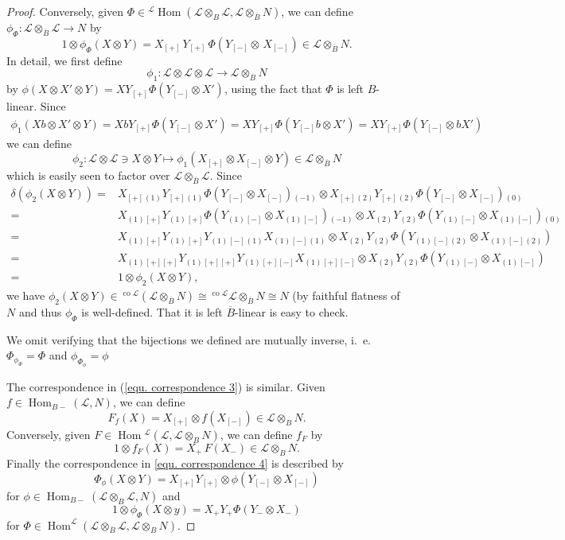 \documentclass[a4paper,reqno]{amsart}
\DeclareMathOperator{\Hom}{Hom}
\numberwithin{equation}{section}
\theoremstyle{plain}
\theoremstyle{remark}
\numberwithin{equation}{section}
\newcommand{\ot}{\otimes}
\newcommand{\cL}{\mathcal{L}}
\newcommand{\BB}{\overline{B}}
\newcommand{\z}{{}_{\scriptscriptstyle{(0)}}}
\renewcommand{\o}{{}_{\scriptscriptstyle{(1)}}}
\newcommand{\mo}{{}_{\scriptscriptstyle{(-1)}}}
\renewcommand{\t}{{}_{\scriptscriptstyle{(2)}}}
\newcommand\ou[1]{\otimes_{#1}}
\newcommand{\CL}{\mathcal{L}}
\newcommand\co{{\operatorname{co}}}
\begin{document}
\begin{proof}
Conversely, given $\Phi\in {}^{\cL}\Hom(\cL\ot_{B}\cL,\cL\ot_{\BB}N)$, we can define $\phi_\Phi\colon \CL\ou\BB\CL\to N$ by
\[1\ot \phi_{\Phi}(X\ot Y)=X_{[+]}\,Y_{[+]}\,\Phi(Y_{[-]}\ot\,X_{[-]})\in\CL\ou\BB N.\]
In detail, we first define 
\[\phi_1\colon \CL\ot \CL\ot\CL\to \CL\ou \BB N\]
by $\phi(X\ot X'\ot Y)=XY_{[+]}\Phi(Y_{[-]}\ot X')$, using the fact that $\Phi$ is left $B$-linear. Since
\begin{multline*}
    \phi_1(Xb\ot X'\ot Y)
    =XbY_{[+]}\Phi(Y_{[-]}\ot X')
    =XY_{[+]}\Phi(Y_{[-]}b\ot X')
    =XY_{[+]}\Phi(Y_{[-]}\ot bX')
\end{multline*}
we can define 
\[\phi_2\colon \CL\ot\CL\ni X\ot Y\mapsto \phi_1(X_{[+]}\ot X_{[-]}\ot Y)\in \CL\ou\BB N \]
which is easily seen to factor over $\CL\ou\BB\CL$. Since
\begin{align*}
   \delta(\phi_2(X\ot Y))
   =&X_{[+]}\o Y_{[+]}\o\Phi(Y_{[-]}\ot X_{[-]})\mo\ot X_{[+]}\t Y_{[+]}\t\Phi(Y_{[-]}\ot X_{[-]})\z
   \\=&X\o{}_{[+]}Y\o{}_{[+]}\Phi(Y\o{}_{[-]}\ot X\o{}_{[-]})\mo\ot X\t Y\t \Phi(Y\o{}_{[-]}\ot X\o{}_{[-]})\z
   \\=&X\o{}_{[+]}Y\o{}_{[+]}Y\o{}_{[-]}\o X\o{}_{[-]}\o\ot X\t Y\t\Phi(Y\o{}_{[-]}\t\ot X\o{}_{[-]}\t)
   \\=&X\o{}_{[+][+]}Y\o{}_{[+][+]}Y\o{}_{[+][-]}X\o{}_{[+][-]}\ot X\t Y\t \Phi(Y\o{}_{[-]}\ot X\o{}_{[-]})
   \\=&1\ot\phi_2(X\ot Y),
\end{align*}
we have $\phi_2(X\ot Y)\in{{}^{\co\CL}(\CL\ou\BB N)}\cong {}^{\co\CL}\CL\ou\BB N\cong N$ (by faithful flatness of $N$ and thus $\phi_\Phi$ is well-defined. That it is left $\BB$-linear is easy to check.

We omit verifying that the bijections we defined are mutually inverse, i.~e.\ $\Phi_{\phi_\Phi}=\Phi$ and $\phi_{\Phi_\phi}=\phi$

The correspondence in (\ref{equ. correspondence 3}) is similar. Given $f\in \Hom_{B-}(\cL,N)$, we can define 
\[F_{f}(X)=X_{[+]}\ot f(X_{[-]})\in \cL\ot_{B}N.\]
Conversely, given $F\in \Hom{}^{\cL}(\cL,\cL\ot_{B}N)$, we can define $f_F$ by 
\[1\ot f_{F}(X)=X_{+}\,F(X_{-})\in \cL\ot_{B}N.\]
Finally the correspondence in \eqref{equ. correspondence 4} is described by
\[\Phi_\phi(X\ot Y)=X_{[+]}Y_{[+]}\ot\phi(Y_{[-]}\ot X_{[-]})\]
for $\phi\in \Hom_{B-}(\CL\ou B\CL,N)$
and 
\[1\ot \phi_\Phi(X\ot y)=X_+Y_+\Phi(Y_-\ot X_-)\]
for $\Phi\in\Hom^\CL(\CL\ou\BB\CL,\CL\ou BN)$.
\end{proof}
\end{document}

